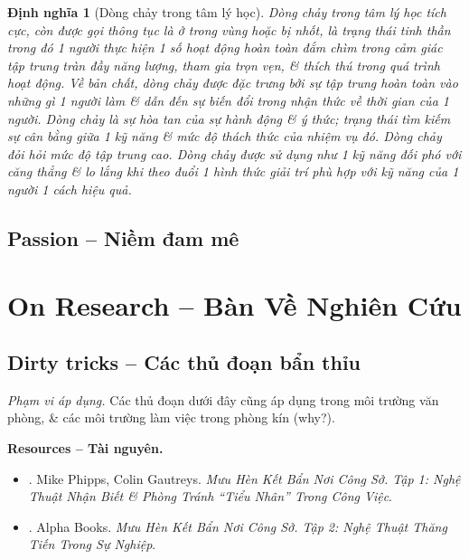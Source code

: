 \documentclass[12pt]{article}
\newtheorem{dinhnghia}{Định nghĩa}[section]
\begin{document}
\begin{dinhnghia}[Dòng chảy trong tâm lý học]
	\emph{Dòng chảy} trong tâm lý học tích cực, còn được gọi thông tục là \emph{ở trong vùng} hoặc \emph{bị nhốt}, là trạng thái tinh thần trong đó 1 người thực hiện 1 số hoạt động hoàn toàn đắm chìm trong cảm giác tập trung tràn đầy năng lượng, tham gia trọn vẹn, \& thích thú trong quá trình hoạt động. Về bản chất, dòng chảy được đặc trưng bởi sự tập trung hoàn toàn vào những gì 1 người làm \& dẫn đến sự biến đổi trong nhận thức về thời gian của 1 người. Dòng chảy là sự hòa tan của sự hành động \& ý thức; trạng thái tìm kiếm sự cân bằng giữa 1 kỹ năng \& mức độ thách thức của nhiệm vụ đó. Dòng chảy đỏi hỏi mức độ tập trung cao. Dòng chảy được sử dụng như 1 kỹ năng đối phó với căng thẳng \& lo lắng khi theo đuổi 1 hình thức giải trí phù hợp với kỹ năng của 1 người 1 cách hiệu quả. 
\end{dinhnghia}

\subsection{Passion -- Niềm đam mê}


\section{On Research -- Bàn Về Nghiên Cứu}
\label{sect: research}

\subsection{Dirty tricks -- Các thủ đoạn bẩn thỉu}
{\it Phạm vi áp dụng.} Các thủ đoạn dưới đây cũng áp dụng trong môi trường văn phòng, \& các môi trường làm việc trong phòng kín (why?).

\noindent\textbf{\textsf{Resources -- Tài nguyên.}}
\begin{itemize}
	\item \cite{Phipps_Gautreys_muu_hen_ke_ban_tap_1}. Mike Phipps, Colin Gautreys. {\it Mưu Hèn Kết Bẩn Nơi Công Sở. Tập 1: Nghệ Thuật Nhận Biết \& Phòng Tránh ``Tiểu Nhân'' Trong Công Việc}.
	\item \cite{muu_hen_ke_ban_tap_2}. Alpha Books. {\it Mưu Hèn Kết Bẩn Nơi Công Sở. Tập 2: Nghệ Thuật Thăng Tiến Trong Sự Nghiệp}.
\end{itemize}
\end{document}
